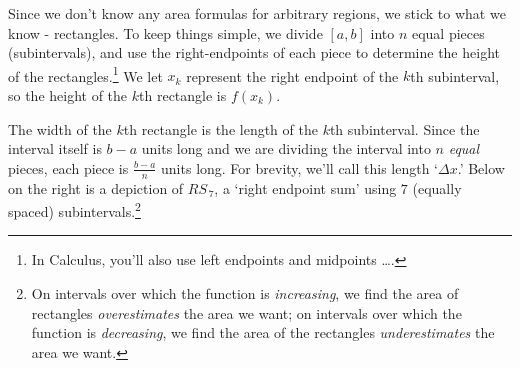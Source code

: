 \documentclass{ximera}
\begin{document}
Since we don't know any area formulas for arbitrary regions, we stick to what we know - rectangles.  To keep things simple, we  divide $[a,b]$ into $n$ equal pieces (subintervals), and use the right-endpoints of each piece to determine the height of the rectangles.\footnote{In Calculus, you'll also use left endpoints and midpoints \ldots.}  We let $x_{k}$ represent the right endpoint of the $k$th subinterval, so the height of the $k$th rectangle is $f(x_{k})$.  

\medskip

The width of the $k$th rectangle is the length of the $k$th subinterval.  Since the interval itself is $b-a$ units long and we are dividing the interval into $n$ \textit{equal} pieces, each piece is $\frac{b-a}{n}$  units long.  For brevity, we'll call this length  `$\Delta x$.'   Below on the right is a depiction of $RS_{\, 7}$, a `right endpoint sum' using $7$ (equally spaced) subintervals.\footnote{On intervals over which the function is \textit{increasing}, we find the area of rectangles \textit{overestimates} the area we want;  on intervals over which the function is \textit{decreasing}, we find the area of the rectangles \textit{underestimates} the area we want.}
\end{document}
